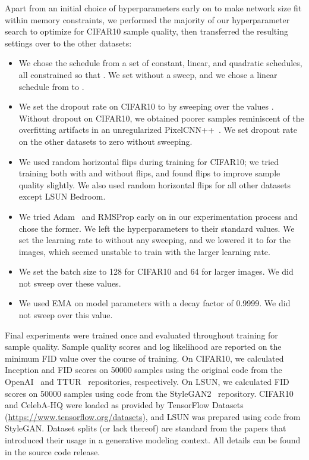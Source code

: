\documentclass{article}
\begin{document}
Apart from an initial choice of hyperparameters early on to make network size fit within memory constraints, we performed the majority of our hyperparameter search to optimize for CIFAR10 sample quality, then transferred the resulting settings over to the other datasets:
\begin{itemize}
    \item We chose the  schedule from a set of constant, linear, and quadratic schedules, all constrained so that . We set  without a sweep, and we chose a linear schedule from  to . 
    \item We set the dropout rate on CIFAR10 to  by sweeping over the values . Without dropout on CIFAR10, we obtained poorer samples reminiscent of the overfitting artifacts in an unregularized PixelCNN++~\citep{salimans2017pixelcnn++}. We set dropout rate on the other datasets to zero without sweeping.
    \item We used random horizontal flips during training for CIFAR10; we tried training both with and without flips, and found flips to improve sample quality slightly. We also used random horizontal flips for all other datasets except LSUN Bedroom.
    \item We tried Adam~\citep{kingma2014adam} and RMSProp early on in our experimentation process and chose the former. We left the hyperparameters to their standard values. We set the learning rate to  without any sweeping, and we lowered it to  for the  images, which seemed unstable to train with the larger learning rate.
    \item We set the batch size to 128 for CIFAR10 and 64 for larger images. We did not sweep over these values.
    \item We used EMA on model parameters with a decay factor of 0.9999. We did not sweep over this value.
\end{itemize}

Final experiments were trained once and evaluated throughout training for sample quality. Sample quality scores and log likelihood are reported on the minimum FID value over the course of training. On CIFAR10, we calculated Inception and FID scores on 50000 samples using the original code from the OpenAI~\citep{salimans2016improved} and TTUR~\citep{heusel2017gans} repositories, respectively. On LSUN, we calculated FID scores on 50000 samples using code from the StyleGAN2~\citep{karras2019analyzing} repository. CIFAR10 and CelebA-HQ were loaded as provided by TensorFlow Datasets (\url{https://www.tensorflow.org/datasets}), and LSUN was prepared using code from StyleGAN. Dataset splits (or lack thereof) are standard from the papers that introduced their usage in a generative modeling context. All details can be found in the source code release.
\end{document}
